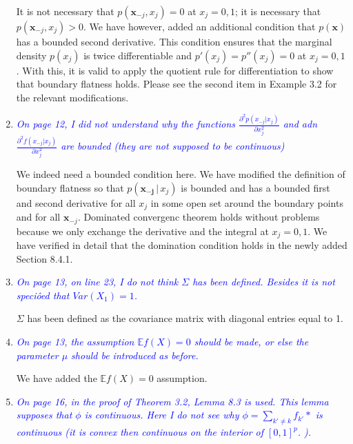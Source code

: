 \documentclass[pdftex,12pt]{article}
\def\E{{\mathbb E}}
\def\rc#1{{\it\textcolor{blue}{#1}}\smallskip}
\begin{document}
\begin{enumerate}
It is not necessary that $p(\mathbf{x}_{-j}, x_j) = 0$ at $x_j = 0,1$; it is necessary that $p(\mathbf{x}_{-j}, x_j) > 0$. We have however, added an additional condition that $p(\mathbf{x})$ has a bounded second derivative. This condition ensures that the marginal density $p(x_j)$ is twice differentiable and $p'(x_j) = p''(x_j) = 0$ at $x_j = 0,1$. With this, it is valid to apply the quotient rule for differentiation to show that boundary flatness holds. Please see the second item in Example 3.2 for the relevant modifications. 


\item \rc{On page 12, I did not understand why the functions 
$\frac{\partial^2 p(x_{-j} |  x_j)}{\partial x_j^2}$
and adn 
$\frac{\partial^2 f(x_{-j} |  x_j)}{\partial x_j^2}$
are bounded (they are not supposed to be continuous)}


We indeed need a bounded condition here. We have modified the definition of boundary flatness so that $p(\mathbf{x_{-j}} \,|\, x_j)$ is bounded and has a bounded first and second derivative for all $x_j$ in some open set around the boundary points and for all $\mathbf{x}_{-j}$. Dominated convergenc theorem holds without problems because we only exchange the derivative and the integral at $x_j = 0,1$. We have verified in detail that the domination condition holds in the newly added Section 8.4.1.


\item \rc{On page 13, on line 23, I do not think $\Sigma$ has been defined. Besides it
is not speciôed that $Var(X_1) = 1$.}

$\Sigma$ has been defined as the covariance matrix with diagonal entries equal to 1.


\item \rc{On page 13, the assumption $\E f(X) = 0$ should be made, or else the
parameter $\mu$ should be introduced as before.}

We have added the $\E f(X) = 0$ assumption.


\item \rc{On page 16, in the proof of Theorem 3.2, Lemma 8.3 is used. This
lemma supposes that $\phi$ is continuous. Here I do not see why $\phi =
\sum_{k'\neq k} f_{k'}*$ is continuous (it is convex then continuous on the interior of
$[0,1]^p$. ).}


\end{enumerate}
\end{document}

